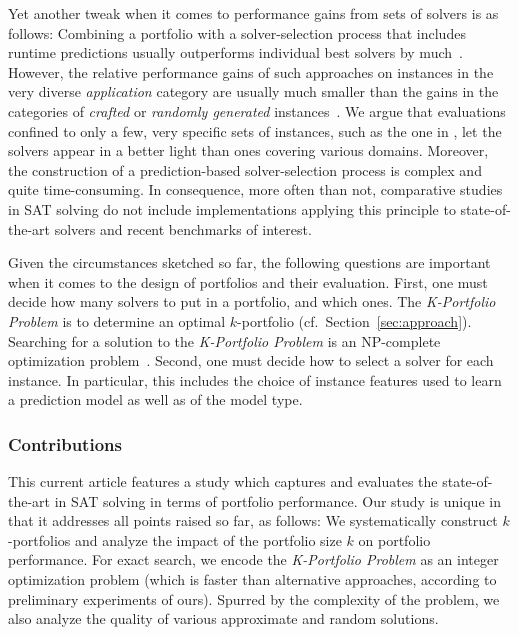 \documentclass[runningheads]{llncs}
\begin{document}
Yet another tweak when it comes to performance gains from sets of solvers is as follows:
Combining a portfolio with a solver-selection process that includes runtime predictions usually outperforms individual best solvers by much~\cite{xu2008satzilla}. 
However, the relative performance gains of such approaches on instances in the very diverse \emph{application} category are usually much smaller than the gains in the categories of \emph{crafted} or \emph{randomly generated} instances~\cite{Xu:2012:EvalContribVBS,Collautti:2013:SNNAP}. 
We argue that evaluations confined to only a few, very specific sets of instances, such as the one in \cite{Kadioglu:2010:ISAC}, let the solvers appear in a better light than ones covering various domains. 
Moreover, the construction of a prediction-based solver-selection process is complex and quite time-consuming.
In consequence, more often than not, comparative studies in SAT solving do not include implementations applying this principle to state-of-the-art solvers and recent benchmarks of interest.

Given the circumstances sketched so far, the following questions are important when it comes to the design of portfolios and their evaluation. 
First, one must decide how many solvers to put in a portfolio, and which ones. 
The \emph{K-Portfolio Problem} is to determine an optimal $k$-portfolio (cf.\ Section~\ref{sec:approach}). 
Searching for a solution to the \emph{K-Portfolio Problem} is an NP-complete optimization problem~\cite{nof2020real}. 
Second, one must decide how to select a solver for each instance. 
In particular, this includes the choice of instance features used to learn a prediction model as well as of the model type. 

\subsubsection{Contributions}

This current article features a study which captures and evaluates the state-of-the-art in SAT solving in terms of portfolio performance. 
Our study is unique in that it addresses all points raised so far, as follows:
We systematically construct $k$-portfolios and analyze the impact of the portfolio size $k$ on portfolio performance. 
For exact search, we encode the \emph{K-Portfolio Problem} as an integer optimization problem (which is faster than alternative approaches, according to preliminary experiments of ours). 
Spurred by the complexity of the problem, we also analyze the quality of various approximate and random solutions. 
\end{document}
